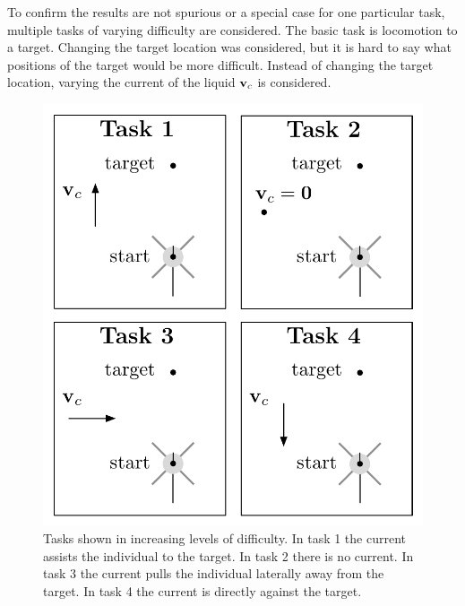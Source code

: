 To confirm the results are not spurious or a special case for one
particular task, multiple tasks of varying difficulty are considered.
The basic task is locomotion to a target.  Changing the target
location was considered, but it is hard to say what positions of the
target would be more difficult.  Instead of changing the target
location, varying the current of the liquid $\mathbf{v}_c$ is considered.

\begin{figure}
  \centering
  \includegraphics[scale=0.8]{fig/tasks.pdf} 
  \caption[Tasks]{\label{fig:tasks}Tasks shown in increasing levels of
    difficulty.  In task 1 the current assists the individual to the
    target.  In task 2 there is no current.  In task 3 the current
    pulls the individual laterally away from the target.  In task 4
    the current is directly against the target.}
\end{figure} 

